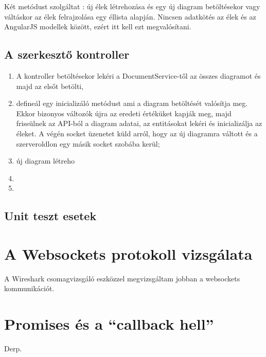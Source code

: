 Két metódust szolgáltat : új élek létrehozása és egy új diagram betöltésekor  vagy váltáskor az élek felrajzolása egy éllista alapján.
Nincsen adatkötés az élek és az AngularJS modellek között, ezért itt kell ezt megvalósítani.


\subsection{A szerkesztő kontroller}

\begin{enumerate}
\item A kontroller betöltésekor lekéri a DocumentService-től az összes diagramot és majd az elsőt betölti,
\item defineál egy inicializáló metódust ami a diagram betöltését valósítja meg. Ekkor bizonyos változók újra az eredeti értéküket kapják meg, majd frissülnek az API-ból a diagram adatai, az entitásokat lekéri és inicializálja az éleket. A végén socket üzenetet küld arról, hogy az új diagramra váltott és a szerveroldlon egy másik socket szobába kerül;
\item új diagram létreho
\item 
\item 
\end{enumerate}


\subsection{Unit teszt esetek}










\section{A Websockets protokoll vizsgálata}

A Wireshark csomagvizsgáló eszközzel megvizsgáltam jobban a websockets kommunikációt.  




\section{Promises és a ``callback hell''}
Derp.


